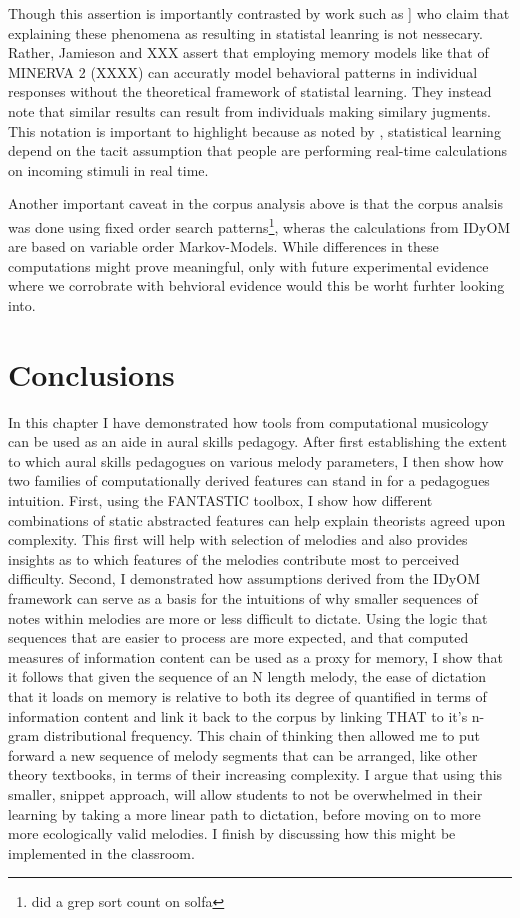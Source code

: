 \documentclass[]{book}
\let\rmarkdownfootnote\footnote%
\def\footnote{\protect\rmarkdownfootnote}
\begin{document}
Though this assertion is importantly contrasted by work such as \citet{jamiesonApplyingExemplarModel2009}{]} who claim that explaining these phenomena as resulting in statistal leanring is not nessecary.
Rather, Jamieson and XXX assert that employing memory models like that of MINERVA 2 (XXXX) can accuratly model behavioral patterns in individual responses without the theoretical framework of statistal learning.
They instead note that similar results can result from individuals making similary jugments.
This notation is important to highlight because as noted by \citet{perruchetImplicitLearningStatistical2006}, statistical learning depend on the tacit assumption that people are performing real-time calculations on incoming stimuli in real time.

Another important caveat in the corpus analysis above is that the corpus analsis was done using fixed order search patterns\footnote{did a grep sort count on solfa}, wheras the calculations from IDyOM are based on variable order Markov-Models.
While differences in these computations might prove meaningful, only with future experimental evidence where we corrobrate with behvioral evidence would this be worht furhter looking into.

\hypertarget{conclusions-1}{%
\section{Conclusions}\label{conclusions-1}}

In this chapter I have demonstrated how tools from computational musicology can be used as an aide in aural skills pedagogy.
After first establishing the extent to which aural skills pedagogues on various melody parameters, I then show how two families of computationally derived features can stand in for a pedagogues intuition.
First, using the FANTASTIC toolbox, I show how different combinations of static abstracted features can help explain theorists agreed upon complexity.
This first will help with selection of melodies and also provides insights as to which features of the melodies contribute most to perceived difficulty.
Second, I demonstrated how assumptions derived from the IDyOM framework can serve as a basis for the intuitions of why smaller sequences of notes within melodies are more or less difficult to dictate.
Using the logic that sequences that are easier to process are more expected, and that computed measures of information content can be used as a proxy for memory, I show that it follows that given the sequence of an N length melody, the ease of dictation that it loads on memory is relative to both its degree of quantified in terms of information content and link it back to the corpus by linking THAT to it's n-gram distributional frequency.
This chain of thinking then allowed me to put forward a new sequence of melody segments that can be arranged, like other theory textbooks, in terms of their increasing complexity.
I argue that using this smaller, snippet approach, will allow students to not be overwhelmed in their learning by taking a more linear path to dictation, before moving on to more more ecologically valid melodies.
I finish by discussing how this might be implemented in the classroom.
\end{document}
